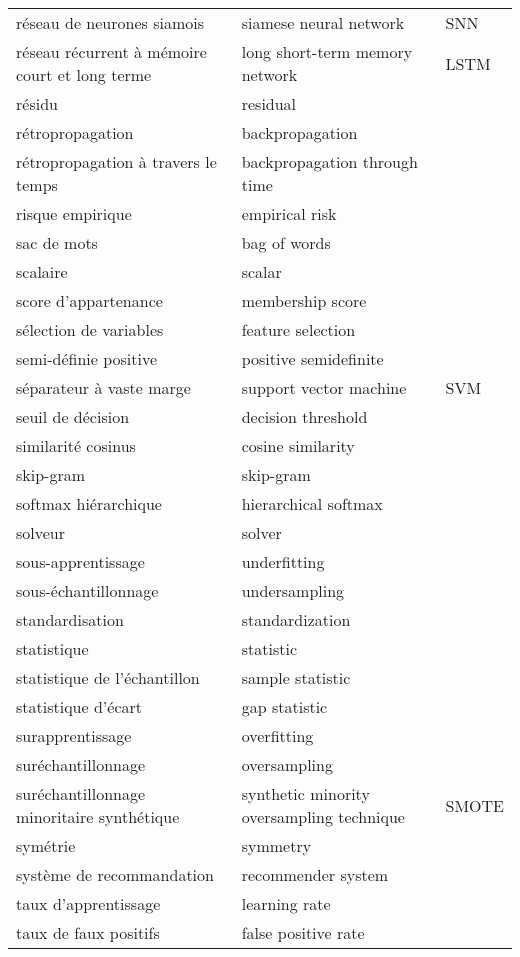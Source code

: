 \begin{longtable}{p{} p{} p{}}
réseau de neurones siamois & siamese neural network & SNN \\ 
réseau récurrent à mémoire court et long terme & long short-term memory network & LSTM \\ 
résidu & residual &  \\ 
rétropropagation & backpropagation &  \\ 
rétropropagation à travers le temps & backpropagation through time &  \\ 
risque empirique & empirical risk &  \\ 
sac de mots & bag of words &  \\ 
scalaire & scalar &  \\ 
score d’appartenance & membership score &  \\ 
sélection de variables & feature selection &  \\ 
semi-définie positive & positive semidefinite &  \\ 
séparateur à vaste marge & support vector machine & SVM \\ 
seuil de décision & decision threshold &  \\ 
similarité cosinus & cosine similarity &  \\ 
skip-gram & skip-gram &  \\ 
softmax hiérarchique & hierarchical softmax &  \\ 
solveur & solver &  \\ 
sous-apprentissage & underfitting &  \\ 
sous-échantillonnage & undersampling &  \\ 
standardisation & standardization &  \\ 
statistique & statistic &  \\ 
statistique de l’échantillon & sample statistic &  \\ 
statistique d'écart & gap statistic &  \\ 
surapprentissage & overfitting &  \\ 
suréchantillonnage & oversampling &  \\ 
suréchantillonnage minoritaire synthétique & synthetic minority oversampling technique & SMOTE  \\ 
symétrie & symmetry &  \\ 
système de recommandation & recommender system &  \\ 
taux d’apprentissage & learning rate &  \\ 
taux de faux positifs & false positive rate &  \\ 

\end{longtable}
